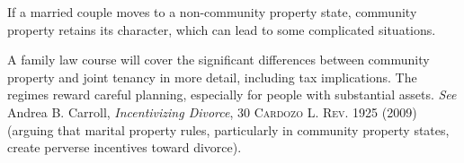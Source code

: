 If a married couple moves to a non-community property state, community property
retains its character, which can lead to some complicated situations.

A family law course will cover the significant differences between community
property and joint tenancy in more detail, including tax implications. The
regimes reward careful planning, especially for people with substantial assets.
\textit{See} Andrea B. Carroll, \textit{Incentivizing Divorce}, 30
\textsc{Cardozo L. Rev.} 1925 (2009) (arguing that marital property rules,
particularly in community property states, create perverse incentives toward
divorce).

